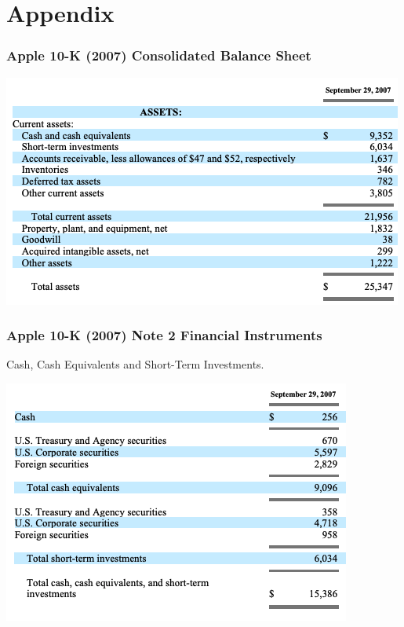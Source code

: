 \documentclass[handout]{beamer}
\begin{document}
\section{Appendix}






\begin{frame}[label=APPL2007]
\frametitle{Apple 10-K (2007) Consolidated Balance Sheet}

\centering
\includegraphics[scale=0.5]{AAPL_2007_bs}
\end{frame}







\begin{frame}
\frametitle{Apple 10-K (2007) Note 2 Financial Instruments}
 Cash, Cash Equivalents and Short-Term Investments.

\centering
\includegraphics[scale=0.5]{AAPL_2007_note2}

\hyperlink{standardapproach}{}
\end{frame}
\end{document}
